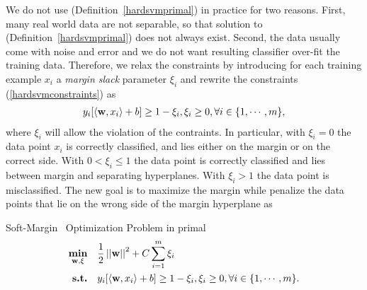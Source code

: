 We do not use (Definition~\ref{hardsvmprimal}) in practice for two reasons. 
First, many real world data are not separable, so that solution to (Definition~\ref{hardsvmprimal}) does not always exist.
Second, the data usually come with noise and error and we do not want resulting classifier over-fit the training data.
Therefore, we relax the constraints by introducing for each training example $x_i$ a \textit{margin slack} parameter $\xi_i$ and rewrite the constraints (\ref{hardsvmconstraints}) as 
\begin{align*}
	y_i[\langle \mathbf {w}, x_i \rangle + b] \ge 1-\xi_i, \xi_i\ge 0, \forall i\in\{1,\cdots,m\},
\end{align*}
where $\xi_i$ will allow the violation of the contraints.
In particular, with $\xi_i=0$ the data point $x_i$ is correctly classified, and lies either on the margin or on the correct side.
With $0<\xi_i\le 1$ the data point is correctly classified and lies between margin and separating hyperplanes.
With $\xi_i>1$ the data point is misclassified.
The new goal is to maximize the margin while penalize the data points that lie on the wrong side of the margin hyperplane as
\begin{definition}{Soft-Margin \svm\ Optimization Problem in primal}\label{softsvmprimal}
	\begin{align*}
		\underset{\mathbf {w},\xi}{\textbf{min}} & \quad\frac{1}{2}\left|\left| \mathbf {w} \right|\right|^2 + C\sum_{i=1}^{m}\xi_i\\
		\textbf{s.t.} & \quad y_i[\langle \mathbf {w}, x_i \rangle + b] \ge 1-\xi_i, \xi_i\ge 0, \forall i\in\{1,\cdots,m\}.
	\end{align*}
\end{definition}



